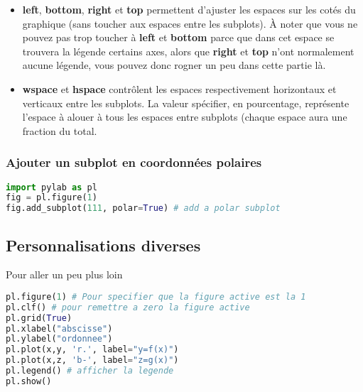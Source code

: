 \documentclass[a4paper,twoside]{article}
\begin{document}
\begin{itemize}
\item \textbf{left}, \textbf{bottom}, \textbf{right} et \textbf{top} permettent d'ajuster les espaces sur les cotés du graphique (sans toucher aux espaces entre les subplots). À noter que vous ne pouvez pas trop toucher à \textbf{left} et \textbf{bottom} parce que dans cet espace se trouvera la légende certains axes, alors que \textbf{right} et \textbf{top} n'ont normalement aucune légende, vous pouvez donc rogner un peu dans cette partie là.
\item \textbf{wspace} et \textbf{hspace} contrôlent les espaces respectivement horizontaux et verticaux entre les subplots. La valeur spécifier, en pourcentage, représente l'espace à alouer à tous les espaces entre subplots (chaque espace aura une fraction du total.
\end{itemize}

\subsubsection{Ajouter un subplot en coordonnées polaires}
\begin{lstlisting}[language=python]
import pylab as pl
fig = pl.figure(1)
fig.add_subplot(111, polar=True) # add a polar subplot
\end{lstlisting}

\subsection{Personnalisations diverses}
Pour aller un peu plus loin
\begin{lstlisting}[language=python]
pl.figure(1) # Pour specifier que la figure active est la 1
pl.clf() # pour remettre a zero la figure active
pl.grid(True)
pl.xlabel("abscisse")
pl.ylabel("ordonnee")
pl.plot(x,y, 'r.', label="y=f(x)")
pl.plot(x,z, 'b-', label="z=g(x)")
pl.legend() # afficher la legende
pl.show()
\end{lstlisting}
\end{document}

